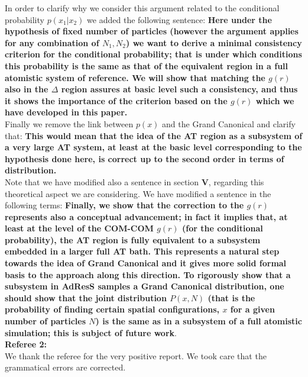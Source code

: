 \documentclass[a4paper]{article}
\begin{document}
In order to clarify why we consider this argument related to the conditional probability $p(x_{1}|x_{2})$ we added the following sentence: {\bf Here under the hypothesis of fixed number of particles (however the argument applies for any combination of $N_{1},N_{2}$) we want to derive a minimal consistency criterion for the conditional probability; that is under which conditions this probability is the same as that of the equivalent region in a full atomistic system of reference. We will show that matching the $g(r)$ also in the $\Delta$ region assures at basic level such a consistency, and thus it shows the importance of the criterion based on the $g(r)$ which we have developed in this paper.}\\
Finally we remove the link between $p(x)$ and the Grand Canonical and clarify that: {\bf This would mean that the idea of the AT region as a subsystem of a very large AT system, at least at the basic level corresponding to the hypothesis done here, is correct up to the second order in terms of distribution.} 
\\
Note that we have modified also a sentence in section {\bf V}, regarding this theoretical aspect we are considering. We have modified a sentence in the following terms: {\bf Finally, we show that the correction to the $g(r)$ represents also a conceptual advancement; in fact it implies that, at least at the level of the COM-COM $g(r)$ (for the conditional probability), the AT region is fully equivalent to a subsystem embedded in a larger full AT bath. This  represents a natural step towards the idea of Grand Canonical and it gives more solid formal basis to the approach along this direction. To rigorously show that a subsystem in AdResS samples a Grand Canonical distribution, one should show that the joint distribution $P(x,N)$ (that is the probability of finding certain spatial configurations, $x$ for a given number of particles $N$) is the same as in a subsystem of a full atomistic simulation; this is subject of future work}.\\

{\bf Referee 2:}\\
We thank the referee for the very positive report. We took care that the grammatical errors are corrected.
\end{document}
